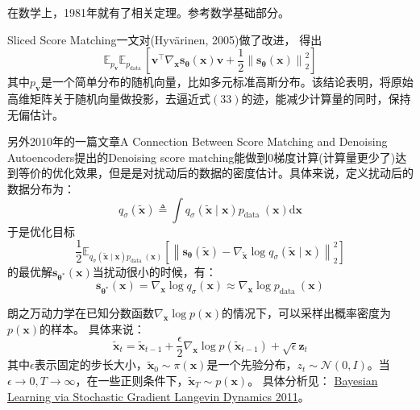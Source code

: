 \documentclass[lang=cn,newtx,10pt,scheme=chinese]{elegantbook}
\begin{document}
在数学上，1981年就有了相关定理。参考数学基础部分。

Sliced Score Matching一文对(Hyvärinen, 2005)做了改进，
得出
\begin{equation}
\mathbb{E}_{p_{\mathbf{v}}} \mathbb{E}_{p_{\text {data }}}\left[\mathbf{v}^{\top} \nabla_{\mathbf{x}} \mathbf{s}_{\boldsymbol{\theta}}(\mathbf{x}) \mathbf{v}+\frac{1}{2}\left\|\mathbf{s}_{\boldsymbol{\theta}}(\mathbf{x})\right\|_2^2\right]
\end{equation}
其中$p_{\mathbf{v}}$是一个简单分布的随机向量，比如多元标准高斯分布。该结论表明，将原始高维矩阵关于随机向量做投影，去逼近式$(33)$的迹，能减少计算量的同时，保持无偏估计。

另外2010年的一篇文章A Connection Between Score Matching and Denoising Autoencoders提出的Denoising score matching能做到0梯度计算(计算量更少了)达到等价的优化效果，但是是对扰动后的数据的密度估计。具体来说，定义扰动后的数据分布为：
\begin{equation}
q_\sigma(\tilde{\mathbf{x}}) \triangleq \int q_\sigma(\tilde{\mathbf{x}} \mid \mathbf{x}) p_{\text {data }}(\mathbf{x}) \mathrm{d} \mathbf{x}
\end{equation}
于是优化目标
\begin{equation}
\frac{1}{2} \mathbb{E}_{q_\sigma(\tilde{\mathbf{x}} \mid \mathbf{x}) p_{\text {data }}(\mathbf{x})}\left[\left\|\mathbf{s}_{\boldsymbol{\theta}}(\tilde{\mathbf{x}})-\nabla_{\tilde{\mathbf{x}}} \log q_\sigma(\tilde{\mathbf{x}} \mid \mathbf{x})\right\|_2^2\right]
\end{equation}
的最优解$\mathbf{s}_{\boldsymbol{\theta}^*}(\mathbf{x})$当扰动很小的时候，有：
\begin{equation}
\mathbf{s}_{\boldsymbol{\theta}^*}(\mathbf{x})=\nabla_{\mathbf{x}} \log q_\sigma(\mathbf{x}) \approx \nabla_{\mathbf{x}} \log p_{\text {data }}(\mathbf{x})
\end{equation}

朗之万动力学在已知分数函数$\nabla_{\mathbf{x}} \log p(\mathbf{x})$的情况下，可以采样出概率密度为$p(\mathbf{x})$的样本。
具体来说：
\begin{equation}
\tilde{\mathbf{x}}_t=\tilde{\mathbf{x}}_{t-1}+\frac{\epsilon}{2} \nabla_{\mathbf{x}} \log p\left(\tilde{\mathbf{x}}_{t-1}\right)+\sqrt{\epsilon} \mathbf{z}_t
\end{equation}
其中$\epsilon$表示固定的步长大小，$\tilde{\mathbf{x}}_0 \sim \pi(\mathbf{x})$是一个先验分布，$z_t \sim \mathcal{N}(0, I)$。当$\epsilon \rightarrow 0, T \rightarrow \infty$，在一些正则条件下，$
\tilde{\mathbf{x}}_T \sim p(\mathbf{x})$。
具体分析见：
\href{https://www.stats.ox.ac.uk/~teh/research/compstats/WelTeh2011a.pdf}{Bayesian Learning via Stochastic Gradient Langevin Dynamics 2011}。
\end{document}
